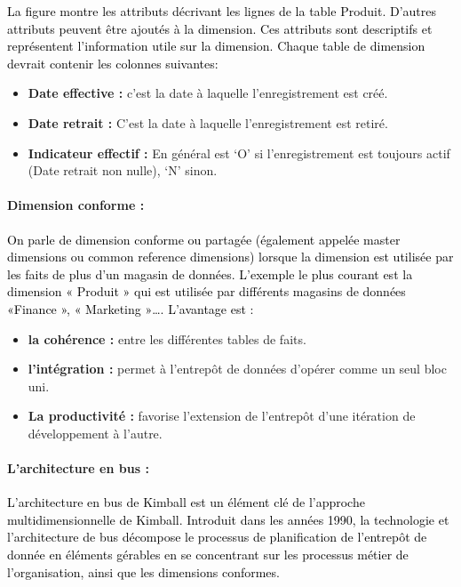 \documentclass[a4paper,12pt]{report}
\begin{document}
\textcolor{black}{La figure montre les attributs décrivant les lignes de la table Produit.
D’autres attributs peuvent être ajoutés à la dimension. Ces attributs sont descriptifs et représentent l’information utile sur la dimension. Chaque table de dimension devrait contenir les colonnes suivantes:
}

\begin{itemize}
\item \textbf{Date effective :}	 c’est la date à laquelle l’enregistrement est créé.

\item \textbf{Date retrait :}	 C’est la date à laquelle l’enregistrement est retiré.

\item	\textbf{Indicateur effectif :} En général est ‘O’ si l’enregistrement est toujours actif (Date retrait non nulle), ‘N’ sinon.

\end{itemize}

\paragraph{Dimension conforme :}

\textcolor{black}{On parle de dimension conforme ou partagée (également appelée master dimensions ou common reference dimensions) lorsque la dimension est utilisée par les faits de plus d’un magasin de données. L’exemple le plus courant est la dimension « Produit » qui est utilisée par différents magasins de données «Finance », « Marketing »…\citep{breslin2004data}. L’avantage est :}

\begin{itemize}
\item	\textbf{la cohérence :} entre les différentes tables de faits.
\item	\textbf{l’intégration :} permet à l'entrepôt de données d'opérer comme un seul bloc uni.
\item	\textbf{La productivité :} favorise l'extension de l'entrepôt d'une itération de développement à l'autre.

\end{itemize}

\paragraph{	L’architecture en bus :	}

\textcolor{black}{L’architecture en bus de Kimball est un élément clé de l’approche multidimensionnelle de Kimball. Introduit dans les années 1990, la technologie et l'architecture de bus décompose le processus de planification de l’entrepôt de donnée en éléments gérables en se concentrant sur les processus métier de l'organisation, ainsi que les dimensions conformes.}
\end{document}
